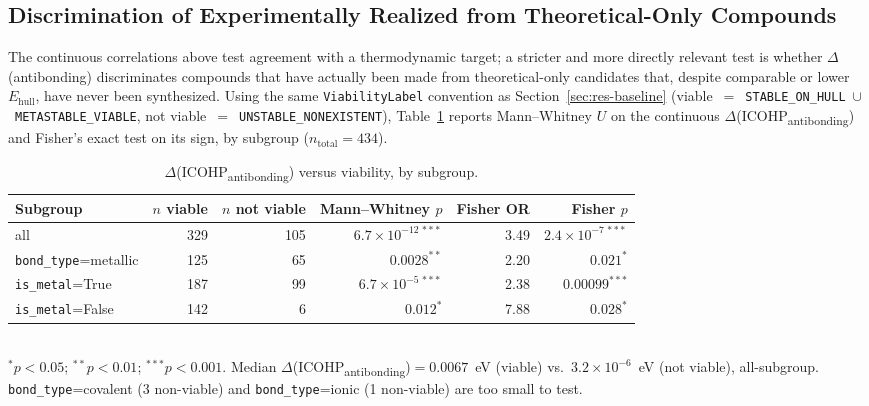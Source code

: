 \documentclass[journal=jpccck,manuscript=article]{achemso}
\begin{document}
\subsection{Discrimination of Experimentally Realized from Theoretical-Only
Compounds}
\label{sec:res-viability}

The continuous correlations above test agreement with a thermodynamic
target; a stricter and more directly relevant test is whether
$\Delta$(antibonding) discriminates compounds that have actually been made
from theoretical-only candidates that, despite comparable or lower
$E_\text{hull}$, have never been synthesized. Using the same
\texttt{ViabilityLabel} convention as Section~\ref{sec:res-baseline}
(viable~$=$~\texttt{STABLE\_ON\_HULL}~$\cup$~\texttt{METASTABLE\_VIABLE},
not viable~$=$~\texttt{UNSTABLE\_NONEXISTENT}), Table~\ref{tab:viability-antibonding}
reports Mann--Whitney $U$ on the continuous
$\Delta$(ICOHP\textsubscript{antibonding}) and Fisher's exact test on its
sign, by subgroup ($n_\text{total}=434$).

\begin{table}[htbp]
\centering
\caption{$\Delta$(ICOHP\textsubscript{antibonding}) versus viability, by
subgroup.}
\label{tab:viability-antibonding}
\begin{tabular}{@{}lrrrrr@{}}
\toprule
Subgroup & $n$ viable & $n$ not viable & Mann--Whitney $p$ & Fisher OR & Fisher $p$ \\
\midrule
all                       & 329 & 105 & $6.7\times10^{-12\,***}$ & 3.49 & $2.4\times10^{-7\,***}$ \\
\texttt{bond\_type}=metallic & 125 & 65  & $0.0028^{**}$            & 2.20 & $0.021^{*}$ \\
\texttt{is\_metal}=True      & 187 & 99  & $6.7\times10^{-5\,***}$  & 2.38 & $0.00099^{***}$ \\
\texttt{is\_metal}=False     & 142 & 6   & $0.012^{*}$              & 7.88 & $0.028^{*}$ \\
\bottomrule
\end{tabular}
\vspace{0.1cm}
\\{\footnotesize $^{*}p<0.05$; $^{**}p<0.01$; $^{***}p<0.001$. Median
$\Delta$(ICOHP\textsubscript{antibonding})$= 0.0067$~eV (viable) vs.\
$3.2\times10^{-6}$~eV (not viable), all-subgroup. \texttt{bond\_type}=covalent
(3 non-viable) and \texttt{bond\_type}=ionic (1 non-viable) are too small to
test.}
\end{table}
\end{document}
